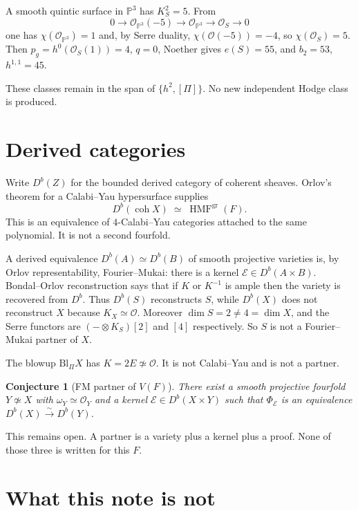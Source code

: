 \documentclass[11pt]{article}
\newtheorem{conjecture}{Conjecture}
\theoremstyle{definition}
\theoremstyle{remark}
\begin{document}
A smooth quintic surface in \(\mathbb{P}^3\) has \(K_S^2=5\). From
\[
0\to\mathcal{O}_{\mathbb{P}^3}(-5)\to\mathcal{O}_{\mathbb{P}^3}\to\mathcal{O}_S\to 0
\]
one has \(\chi(\mathcal{O}_{\mathbb{P}^3})=1\) and, by Serre duality, \(\chi(\mathcal{O}(-5))=-4\), so \(\chi(\mathcal{O}_S)=5\). Then \(p_g=h^0(\mathcal{O}_S(1))=4\), \(q=0\), Noether gives \(e(S)=55\), and \(b_2=53\), \(h^{1,1}=45\).

These classes remain in the span of \(\{h^2,[\Pi]\}\). No new independent Hodge class is produced.

\section{Derived categories}

Write \(D^b(Z)\) for the bounded derived category of coherent sheaves. Orlov's theorem for a Calabi--Yau hypersurface supplies
\[
D^b(\operatorname{coh} X)\;\simeq\;\operatorname{HMF}^{\mathrm{gr}}(F).
\]
This is an equivalence of \(4\)-Calabi--Yau categories attached to the same polynomial. It is not a second fourfold.

A derived equivalence \(D^b(A)\simeq D^b(B)\) of smooth projective varieties is, by Orlov representability, Fourier--Mukai: there is a kernel \(\mathcal{E}\in D^b(A\times B)\). Bondal--Orlov reconstruction says that if \(K\) or \(K^{-1}\) is ample then the variety is recovered from \(D^b\). Thus \(D^b(S)\) reconstructs \(S\), while \(D^b(X)\) does not reconstruct \(X\) because \(K_X\simeq\mathcal{O}\). Moreover \(\dim S=2\neq 4=\dim X\), and the Serre functors are \((-\otimes K_S)[2]\) and \([4]\) respectively. So \(S\) is not a Fourier--Mukai partner of \(X\).

The blowup \(\mathrm{Bl}_\Pi X\) has \(K=2E\not\simeq\mathcal{O}\). It is not Calabi--Yau and is not a partner.

\begin{conjecture}[FM partner of \(V(F)\)]
There exist a smooth projective fourfold \(Y\not\simeq X\) with \(\omega_Y\simeq\mathcal{O}_Y\) and a kernel \(\mathcal{E}\in D^b(X\times Y)\) such that \(\Phi_{\mathcal{E}}\) is an equivalence \(D^b(X)\xrightarrow{\sim}D^b(Y)\).
\end{conjecture}

This remains open. A partner is a variety plus a kernel plus a proof. None of those three is written for this \(F\).

\section{What this note is not}
\end{document}

